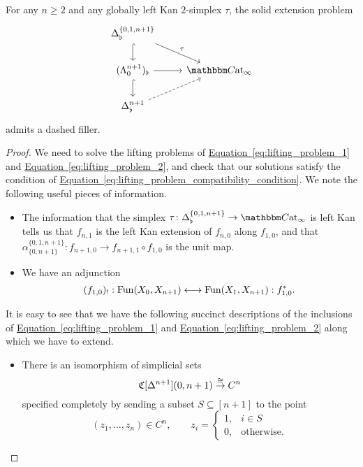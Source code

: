 \documentclass[main.tex]{subfiles}
\begin{document}
\begin{theorem}
  For any $n \geq 2$ and any globally left Kan $2$-simplex $\tau$, the solid extension problem
  \begin{equation*}
    \begin{tikzcd}
      \Delta^{\{0, 1, n+1\}}_{\flat}
      \arrow[d, hook]
      \arrow[dr, "\tau"]
      \\
      (\Lambda^{n+1}_{0})_{\flat}
      \arrow[r]
      \arrow[d, hook]
      & \ICCat
      \\
      \Delta^{n+1}_{\flat}
      \arrow[ur, dashed]
    \end{tikzcd}
  \end{equation*}
  admits a dashed filler.
\end{theorem}
\begin{proof}
  We need to solve the lifting problems of \hyperref[eq:lifting_problem_1]{Equation~\ref*{eq:lifting_problem_1}} and \hyperref[eq:lifting_problem_2]{Equation~\ref*{eq:lifting_problem_2}}, and check that our solutions satisfy the condition of \hyperref[eq:lifting_problem_compatibility_condition]{Equation~\ref*{eq:lifting_problem_compatibility_condition}}. We note the following useful pieces of information.

  \begin{itemize}
    \item The information that the simplex $\tau\colon \Delta^{\{0,1,n+1\}}_{\flat} \to \ICCat$ is left Kan tells us that $f_{n,1}$ is the left Kan extension of $f_{n, 0}$ along $f_{1, 0}$, and that $\alpha_{\{0,n+1\}}^{\{0,1,n+1\}}\colon f_{n+1,0} \to f_{n+1, 1} \circ f_{1, 0} $ is the unit map.

    \item We have an adjunction
  \begin{equation*}
    (f_{1,0})_{!} : \mathrm{Fun}(X_{0}, X_{n+1}) \longleftrightarrow \mathrm{Fun}(X_{1}, X_{n+1}) : f_{1,0}^{*}.
  \end{equation*}
  \end{itemize}

  It is easy to see that we have the following succinct descriptions of the inclusions of \hyperref[eq:lifting_problem_1]{Equation~\ref*{eq:lifting_problem_1}} and \hyperref[eq:lifting_problem_2]{Equation~\ref*{eq:lifting_problem_2}} along which we have to extend.
  \begin{itemize}
    \item There is an isomorphism of simplicial sets
      \begin{equation*}
        \mathfrak{C}[\Delta^{n+1}](0, n+1) \overset{\cong}{\to} C^{n}
      \end{equation*}
      specified completely by sending a subset $S \subseteq [n+1]$ to the point
      \begin{equation*}
        (z_{1}, \ldots, z_{n}) \in C^{n},\qquad z_{i} =
        \begin{cases}
          1, & i \in S \\
          0, &\text{otherwise.}
        \end{cases}
      \end{equation*}


\end{itemize}
\end{proof}
\end{document}
